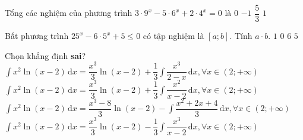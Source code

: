 \begin{ex}%
	Tổng các nghiệm của phương trình $3\cdot 9^x-5\cdot 6^x+2\cdot 4^x=0$ là
	\choice
	{$0$}
	{\True $-1$}
	{$\dfrac{5}{3}$}
	{$1$}
\end{ex}

\begin{ex}%
	Bất phương trình $25^x-6\cdot 5^x+5\leq 0$ có tập nghiệm là $[a;b]$. Tính $a\cdot b$. 
	\choice
	{$1$}
	{\True $0$}
	{$6$}
	{$5$}
\end{ex}

\begin{ex}%
	Chọn khẳng định \textbf{sai}? 
	\choice
	{$\displaystyle\int x^2\ln(x-2)\mathrm{\,d}x=\dfrac{x^3}{3}\ln(x-2)+\dfrac{1}{3}\displaystyle\int\dfrac{x^3}{2-x}\mathrm{\,d}x,\forall x\in(2;+\infty)$}
	{\True $\displaystyle\int x^2\ln(x-2)\mathrm{\,d}x=\dfrac{x^3}{3}\ln(x-2)+\dfrac{1}{3}\displaystyle\int\dfrac{x^2}{x-2}\mathrm{\,d}x,\forall x\in(2;+\infty)$}
	{$\displaystyle\int x^2\ln(x-2)\mathrm{\,d}x=\dfrac{x^3-8}{3}\ln(x-2)-\displaystyle\int\dfrac{x^2+2x+4}{3}\mathrm{\,d}x,\forall x\in(2;+\infty)$}
	{$\displaystyle\int x^2\ln(x-2)\mathrm{\,d}x=\dfrac{x^3}{3}\ln(x-2)-\dfrac{1}{3}\displaystyle\int\dfrac{x^3}{x-2}\mathrm{\,d}x,\forall x\in(2;+\infty)$}
\end{ex}

